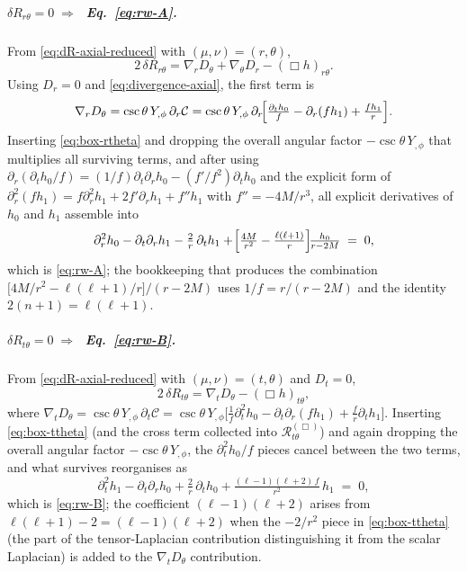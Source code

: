 \subparagraph{$\delta R_{r\theta} = 0 \;\Rightarrow\;$
Eq.~\eqref{eq:rw-A}.}
From \eqref{eq:dR-axial-reduced} with
$(\mu,\nu) = (r,\theta)$,
\begin{equation}
  2\,\delta R_{r\theta}
  = \nabla_{r}D_{\theta}+\nabla_{\theta}D_{r}
   -(\Box h)_{r\theta}.
\end{equation}
Using $D_{r}=0$ and \eqref{eq:divergence-axial}, the first term is
\begin{equation}
  \nabla_{r}D_{\theta}
  = \csc\theta\,Y_{,\phi}\,
    \partial_{r}\mathcal{C}
  = \csc\theta\,Y_{,\phi}\,
    \partial_{r}\!\Bigl[
      \tfrac{\partial_{t}h_{0}}{f}
      -\partial_{r}(f h_{1})
      +\tfrac{f h_{1}}{r}\Bigr].
\end{equation}
Inserting \eqref{eq:box-rtheta} and dropping the overall
angular factor $-\csc\theta\,Y_{,\phi}$ that multiplies all
surviving terms, and after using
$\partial_{r}(\partial_{t}h_{0}/f)
  = (1/f)\partial_{t}\partial_{r}h_{0}
   - (f'/f^{2})\partial_{t}h_{0}$ and the explicit form of
$\partial_{r}^{2}(f h_{1})
  = f\partial_{r}^{2}h_{1}
   +2f'\partial_{r}h_{1}+f''h_{1}$ with $f''=-4M/r^{3}$, all
explicit derivatives of $h_{0}$ and $h_{1}$ assemble into
\begin{equation}
  \partial_{r}^{2}h_{0}
  -\partial_{t}\partial_{r}h_{1}
  -\tfrac{2}{r}\,\partial_{t}h_{1}
  +\!\Bigl[\tfrac{4M}{r^{2}}-\tfrac{\ell(\ell+1)}{r}\Bigr]\!
   \tfrac{h_{0}}{r-2M}
  \;=\; 0,
\label{eq:rw-A-derived}
\end{equation}
which is \eqref{eq:rw-A}; the bookkeeping that produces the
combination $\bigl[4M/r^{2}-\ell(\ell+1)/r\bigr]/(r-2M)$ uses
$1/f = r/(r-2M)$ and the identity $2(n+1)=\ell(\ell+1)$.

\subparagraph{$\delta R_{t\theta} = 0 \;\Rightarrow\;$
Eq.~\eqref{eq:rw-B}.}
From \eqref{eq:dR-axial-reduced} with
$(\mu,\nu) = (t,\theta)$ and $D_{t}=0$,
\begin{equation}
  2\,\delta R_{t\theta}
  = \nabla_{t}D_{\theta} - (\Box h)_{t\theta},
\end{equation}
where
$\nabla_{t}D_{\theta}=\csc\theta\,Y_{,\phi}\,\partial_{t}\mathcal{C}
= \csc\theta\,Y_{,\phi}\bigl[
  \tfrac{1}{f}\partial_{t}^{2}h_{0}
  -\partial_{t}\partial_{r}(f h_{1})
  +\tfrac{f}{r}\partial_{t}h_{1}\bigr]$.
Inserting \eqref{eq:box-ttheta} (and the cross term
collected into $\mathcal{R}_{t\theta}^{(\Box)}$) and again
dropping the overall angular factor
$-\csc\theta\,Y_{,\phi}$, the
$\partial_{t}^{2}h_{0}/f$ pieces cancel between the two terms,
and what survives reorganises as
\begin{equation}
  \partial_{t}^{2}h_{1}
  -\partial_{t}\partial_{r}h_{0}
  +\tfrac{2}{r}\,\partial_{t}h_{0}
  +\tfrac{(\ell-1)(\ell+2)\,f}{r^{2}}\,h_{1}
  \;=\; 0,
\label{eq:rw-B-derived}
\end{equation}
which is \eqref{eq:rw-B}; the coefficient $(\ell-1)(\ell+2)$
arises from $\ell(\ell+1)-2 = (\ell-1)(\ell+2)$ when the $-2/r^{2}$
piece in \eqref{eq:box-ttheta} (the part of the
tensor-Laplacian contribution distinguishing it from the scalar
Laplacian) is added to the $\nabla_{t}D_{\theta}$ contribution.

